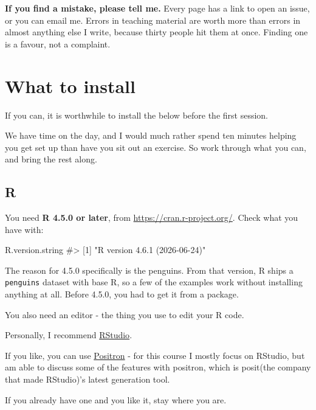 \documentclass[
  letterpaper,
  justified,
  a4paper]{tufte-book}
\makeatletter
\newenvironment{Shaded}{\begin{snugshade}}{\end{snugshade}}
\newcommand{\CommentTok}[1]{\textcolor[rgb]{0.37,0.37,0.37}{#1}}
\newcommand{\NormalTok}[1]{\textcolor[rgb]{0.00,0.23,0.31}{#1}}
\let\rbporigShaded\Shaded
\let\rbporigendShaded\endShaded
\renewenvironment{Shaded}{%
  \begingroup
  \ifdim\linewidth=\rbpbodywidth
    \advance\linewidth by \@tufte@overhang
    \advance\hsize by \@tufte@overhang
    \advance\columnwidth by \@tufte@overhang
  \fi
  \rbporigShaded
}{%
  \rbporigendShaded
  \endgroup
}
\makeatother
\begin{document}
\textbf{If you find a mistake, please tell me.} Every page has a link to
open an issue, or you can email me. Errors in teaching material are
worth more than errors in almost anything else I write, because thirty
people hit them at once. Finding one is a favour, not a complaint.

\section*{What to install}\label{what-to-install}


If you can, it is worthwhile to install the below before the first
session.

We have time on the day, and I would much rather spend ten minutes
helping you get set up than have you sit out an exercise. So work
through what you can, and bring the rest along.

\subsection*{R}\label{r}

You need \textbf{R 4.5.0 or later}, from
\url{https://cran.r-project.org/}. Check what you have with:

\begin{Shaded}
\begin{Highlighting}[]
\NormalTok{R.version.string}
\CommentTok{\#\textgreater{} [1] "R version 4.6.1 (2026{-}06{-}24)"}
\end{Highlighting}
\end{Shaded}

The reason for 4.5.0 specifically is the penguins. From that version, R
ships a \texttt{penguins} dataset with base R, so a few of the examples
work without installing anything at all. Before 4.5.0, you had to get it
from a package.

You also need an editor - the thing you use to edit your R code.

Personally, I recommend
\href{https://posit.co/download/rstudio-desktop/}{RStudio}.

If you like, you can use \href{https://positron.posit.co/}{Positron} -
for this course I mostly focus on RStudio, but am able to discuss some
of the features with positron, which is posit(the company that made
RStudio)'s latest generation tool.

If you already have one and you like it, stay where you are.
\end{document}
